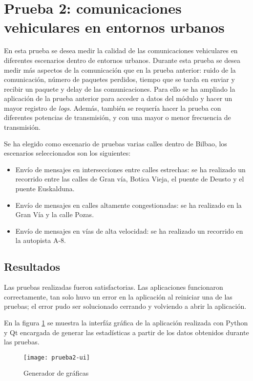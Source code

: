 \section{Prueba 2: comunicaciones vehiculares en entornos urbanos}
En esta prueba se desea medir la calidad de las comunicaciones vehiculares
en diferentes escenarios dentro de entornos urbanos. Durante esta prueba
se desea medir más aspectos de la comunicación que en la prueba anterior:
ruido de la comunicación, número de paquetes perdidos, tiempo que se tarda
en enviar y recibir un paquete y delay de las comunicaciones. Para ello se
ha ampliado la aplicación de la prueba anterior para acceder a datos del
módulo y hacer un mayor registro de \emph{logs}. Además, también se requería
hacer la prueba con diferentes potencias de transmisión, y con una mayor
o menor frecuencia de transmisión.

Se ha elegido como escenario de pruebas varias calles dentro de Bilbao, los
escenarios seleccionados son los siguientes:
\begin{itemize}
	\item Envío de mensajes en intersecciones entre calles estrechas: se ha
	realizado un recorrido entre las calles de Gran vía, Botica Vieja, el 
	puente de Deusto y el puente Euskalduna.
	\item Envío de mensajes en calles altamente congestionadas: se ha realizado
	en la Gran Vía y la calle Pozas.
	\item Envío de mensajes en vías de alta velocidad: se ha realizado un
	recorrido en la	autopista A-8.
\end{itemize}

\subsection{Resultados}
Las pruebas realizadas fueron satisfactorias. Las aplicaciones funcionaron
correctamente, tan solo huvo un error en la aplicación al reiniciar una de 
las pruebas; el error pudo ser solucionado cerrando y volviendo a abrir
la aplicación.

En la figura \ref{fig:prueba2-ui} se muestra la interfáz gráfica de la
aplicación realizada con Python y Qt encargada de generar las estadísticas
a partir de los datos obtenidos durante las pruebas.

\begin{figure}[H]
	\begin{center}
		\texttt{[image: prueba2-ui]}
		\caption{Generador de gráficas}
		\label{fig:prueba2-ui}
	\end{center}
\end{figure}